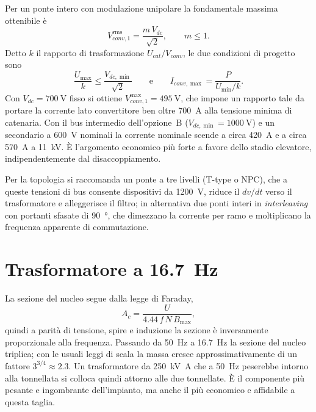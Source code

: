 Per un ponte intero con modulazione unipolare la fondamentale massima ottenibile è
\begin{equation}
V_{conv,1}^{\mathrm{rms}} = \frac{m\,V_{dc}}{\sqrt{2}}, \qquad m \le 1 .
\end{equation}
Detto $k$ il rapporto di trasformazione $U_{cat}/V_{conv}$, le due condizioni di progetto
sono
\begin{equation}
\frac{U_{\max}}{k} \le \frac{V_{dc,\min}}{\sqrt{2}}
\qquad\text{e}\qquad
I_{conv,\max} = \frac{P}{U_{\min}/k} .
\end{equation}
Con $V_{dc}=\SI{700}{\volt}$ fisso si ottiene $V_{conv,1}^{\max}=\SI{495}{\volt}$, che
impone un rapporto tale da portare la corrente lato convertitore ben oltre
\SI{700}{\ampere} alla tensione minima di catenaria. Con il bus intermedio dell'opzione~B
($V_{dc,\min}=\SI{1000}{\volt}$) e un secondario a \SI{600}{\volt} nominali la corrente
nominale scende a circa \SI{420}{\ampere} e a circa \SI{570}{\ampere} a
\SI{11}{\kilo\volt}. È l'argomento economico più forte a favore dello stadio elevatore,
indipendentemente dal disaccoppiamento.

Per la topologia si raccomanda un ponte a tre livelli (T-type o NPC), che a queste
tensioni di bus consente dispositivi da \SI{1200}{\volt}, riduce il $dv/dt$ verso il
trasformatore e alleggerisce il filtro; in alternativa due ponti interi in
\emph{interleaving} con portanti sfasate di \SI{90}{\degree}, che dimezzano la corrente
per ramo e moltiplicano la frequenza apparente di commutazione.

\section{Trasformatore a \SI{16.7}{\hertz}}

La sezione del nucleo segue dalla legge di Faraday,
\begin{equation}
A_c = \frac{U}{4.44\, f\, N\, B_{\max}} ,
\end{equation}
quindi a parità di tensione, spire e induzione la sezione è inversamente proporzionale
alla frequenza. Passando da \SI{50}{\hertz} a \SI{16.7}{\hertz} la sezione del nucleo
triplica; con le usuali leggi di scala la massa cresce approssimativamente di un fattore
$3^{3/4}\approx\num{2.3}$. Un trasformatore da \SI{250}{\kilo\volt\ampere} che a
\SI{50}{\hertz} peserebbe intorno alla tonnellata si colloca quindi attorno alle due
tonnellate. È il componente più pesante e ingombrante dell'impianto, ma anche il più
economico e affidabile a questa taglia.

